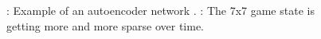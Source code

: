 \begin{figure}[tb]
    \centering
    \hfill%
    \captionadjust%
    \caption{\label{fig:autoencoderSparseMatrix}
    \protect{}: Example of an autoencoder network \cite{Img:autoencoder}.
    \protect{}: The 7x7 game state is getting more and more sparse over time.
    }%
\end{figure}

